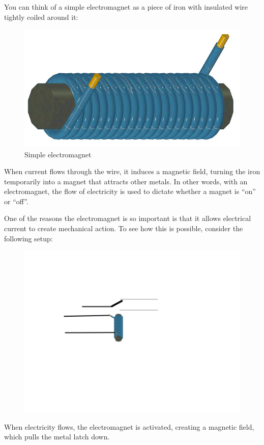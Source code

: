 \documentclass[UTF8]{book}
\begin{document}
\begin{CJK}{UTF8}{gbsn}
You can think of a simple electromagnet as a piece of iron with insulated wire tightly coiled around it:

\begin{figure}[H]
\centering
\includegraphics[width=0.8\linewidth]{electromagnet}
\caption{Simple electromagnet}
\end{figure}

When current flows through the wire, it induces a magnetic field, turning the iron temporarily into a magnet that attracts other metals. In other words, with an electromagnet, the flow of electricity is used to dictate whether a magnet is ``on'' or ``off''.

One of the reasons the electromagnet is so important is that it allows electrical current to create mechanical action. To see how this is possible, consider the following setup:

\begin{figure}[H]
\centering
\includegraphics[width=0.8\linewidth]{electromagnet_with_latch}
\end{figure}

When electricity flows, the electromagnet is activated, creating a magnetic field, which pulls the metal latch down.


\end{CJK}
\end{document}
